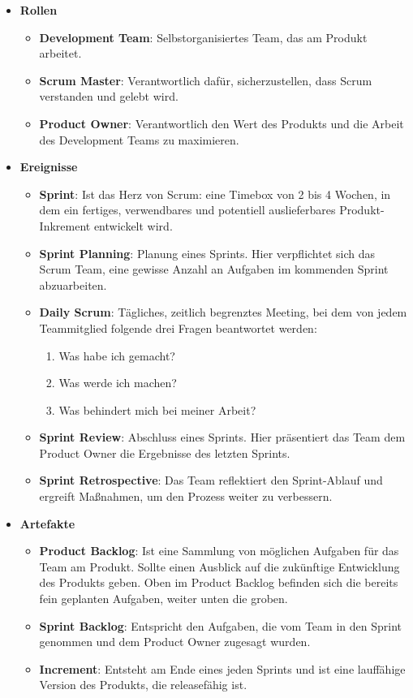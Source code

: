 \begin{itemize}
  \item \textbf{Rollen}
  \begin{itemize}
    \item \textbf{Development Team}: Selbstorganisiertes Team, das am Produkt arbeitet.
    \item \textbf{Scrum Master}: Verantwortlich dafür, sicherzustellen, dass Scrum verstanden und gelebt wird.
    \item \textbf{Product Owner}: Verantwortlich den Wert des Produkts und die Arbeit des Development Teams zu maximieren.
  \end{itemize}
  \item \textbf{Ereignisse}
  \begin{itemize}
    \item \textbf{Sprint}: Ist das Herz von Scrum: eine Timebox von 2 bis 4 Wochen, in dem ein fertiges, verwendbares und potentiell auslieferbares Produkt-Inkrement entwickelt wird.
    \item \textbf{Sprint Planning}: Planung eines Sprints. Hier verpflichtet sich das Scrum Team, eine gewisse Anzahl an Aufgaben im kommenden Sprint abzuarbeiten.
    \item \textbf{Daily Scrum}: Tägliches, zeitlich begrenztes Meeting, bei dem von jedem Teammitglied folgende drei Fragen beantwortet werden:
    \begin{enumerate}
      \item Was habe ich gemacht?
      \item Was werde ich machen?
      \item Was behindert mich bei meiner Arbeit?
    \end{enumerate}
    \item \textbf{Sprint Review}: Abschluss eines Sprints. Hier präsentiert das Team dem Product Owner die Ergebnisse des letzten Sprints.
    \item \textbf{Sprint Retrospective}: Das Team reflektiert den Sprint-Ablauf und ergreift Maßnahmen, um den Prozess weiter zu verbessern.
  \end{itemize}
  \item \textbf{Artefakte}
  \begin{itemize}
    \item \textbf{Product Backlog}: Ist eine Sammlung von möglichen Aufgaben für das Team am Produkt. Sollte einen Ausblick auf die zukünftige Entwicklung des Produkts geben. Oben im Product Backlog befinden sich die bereits fein geplanten Aufgaben, weiter unten die groben.
    \item \textbf{Sprint Backlog}: Entspricht den Aufgaben, die vom Team in den Sprint genommen und dem Product Owner zugesagt wurden.
    \item \textbf{Increment}: Entsteht am Ende eines jeden Sprints und ist eine lauffähige Version des Produkts, die releasefähig ist.
  \end{itemize}
\end{itemize}

